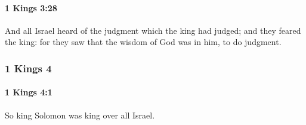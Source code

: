 		\paragraph{1 Kings 3:28} %
			\label{1KINGS-3-28}

			And all Israel heard of the judgment which the king had judged; and they feared the king: for they saw that the wisdom of God was in him, to do judgment.

	\subsubsection{1 Kings 4} %
		\label{1KINGS-4}

		\paragraph{1 Kings 4:1} %
			\label{1KINGS-4-1}

			So king Solomon was king over all Israel.

